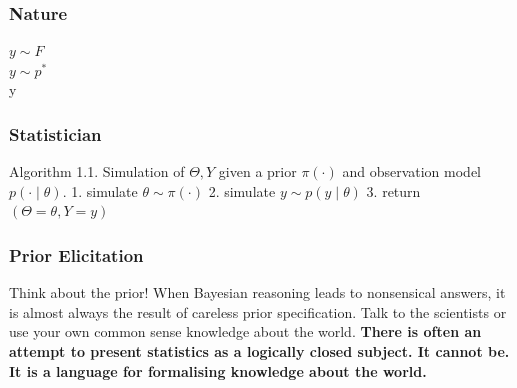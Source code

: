 \documentclass{article}
\begin{document}
\subsubsection{Nature}
$y \sim F$ \\
$y \sim p^*$ \\
 y \\
\subsubsection{Statistician}
Algorithm 1.1. Simulation of $\Theta, Y$ given a prior $\pi(\cdot)$ and observation model $p(\cdot \mid \theta)$.
1. simulate $\theta \sim \pi(\cdot)$
2. simulate $y \sim p(y \mid \theta)$
3. return $(\Theta=\theta, Y=y)$

\subsubsection{Prior Elicitation}
Think about the prior! When Bayesian reasoning leads to nonsensical answers, it is almost always  the result of careless prior specification.
Talk to the scientists or use your own common sense knowledge about the world. \textbf{There is often  an attempt to present statistics as a logically closed subject. It cannot be. It is a language for  formalising knowledge about the world. }
\end{document}
